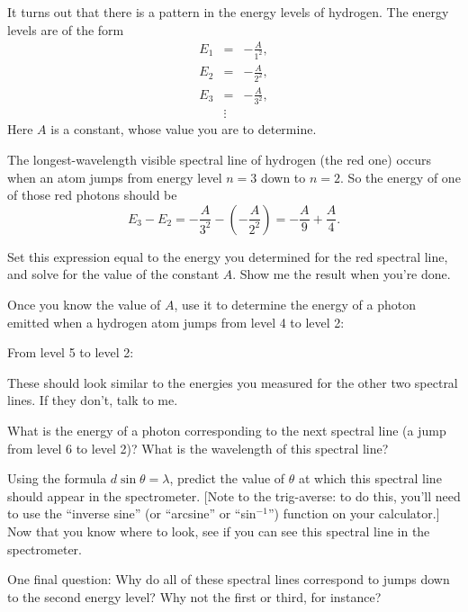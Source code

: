 It turns out that there is a pattern in the energy levels of hydrogen.
The energy levels are of the form
\begin{eqnarray*}
E_1&=&-\frac{A}{1^2},\\
E_2&=&-\frac{A}{2^2},\\
E_3&=&-\frac{A}{3^2},\\
&\vdots&
\end{eqnarray*}
Here $A$ is a constant, whose value you are to determine.

\pagebreak[4]

The longest-wavelength visible spectral line of hydrogen
(the red one) occurs when an atom jumps from energy level $n=3$
down to $n=2$.  So the energy of one of those red photons should be
$$
E_3-E_2=-\frac{A}{3^2}-\left(-\frac{A}{2^2}\right)=-\frac{A}{9}+\frac{A}{4}.
$$

Set this expression equal to the energy you determined for the red spectral
line, and solve for the value of the constant $A$.  Show me the
result when you're done.

\answerspace{2.5in}

\pagebreak[3]

Once you know the value of $A$, use it to determine the energy of a photon
emitted when a hydrogen atom jumps from level 4 to level 2:

\answerspace{1in}

From level 5 to level 2:

\answerspace{1in}

These should look similar to the energies you measured for the other
two spectral lines.  If they don't, talk to me.

What is the energy of a photon corresponding to the next spectral line
(a jump from level 6 to level 2)?  What is the wavelength of 
this spectral line?

\answerspace{1.5in}

Using the formula $d\sin\theta=\lambda$, predict the value of $\theta$
at which this spectral line should appear in the spectrometer.
[Note to the trig-averse: to do this, you'll need to use the ``inverse
sine'' (or ``arcsine'' or ``sin$^{-1}$'') function on your calculator.]
Now that you know where to look, see if you can see this spectral line
in the spectrometer.

\answerspace{1in}

One final question: Why do all of these spectral lines correspond
to jumps down to the second energy level?  Why not the first or third,
for instance?



